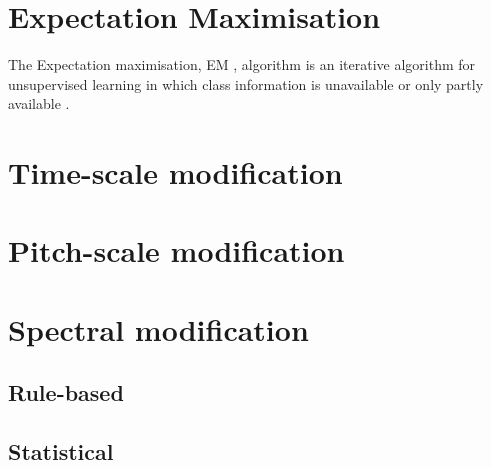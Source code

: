 \section{Expectation Maximisation} %
\label{sec:expectation_maximisation}
The Expectation maximisation, EM , algorithm is an iterative algorithm for unsupervised learning in which class information is unavailable or only partly available \cite{taletek}.

\section{Time-scale modification} %
\label{sec:time_scale_modification}


\section{Pitch-scale modification} %
\label{sec:pitch_scale_modification}


\section{Spectral modification} %
\label{sec:spectral_modification}

\subsection{Rule-based} %
\label{sub:rule_based}


\subsection{Statistical} %
\label{sub:statistical}

